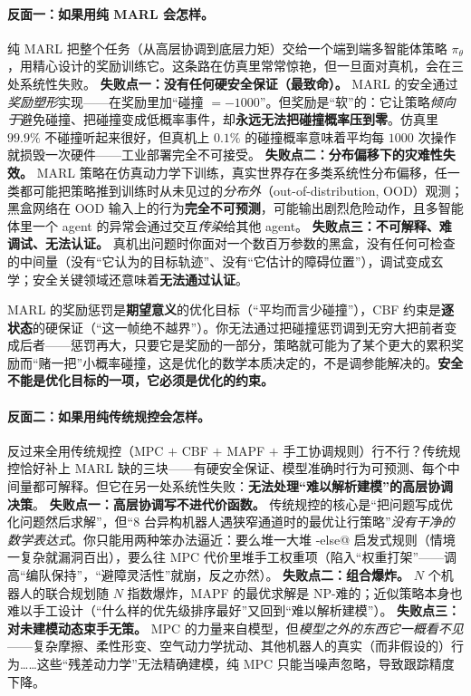 \paragraph{反面一：如果用纯 MARL 会怎样。}
纯 MARL 把整个任务（从高层协调到底层力矩）交给一个端到端多智能体策略 $\pi_\theta$，用精心设计的奖励训练它。这条路在仿真里常常惊艳，但一旦面对真机，会在三处系统性失败。
\textbf{失败点一：没有任何硬安全保证（最致命）。} MARL 的安全通过\emph{奖励塑形}实现——在奖励里加“碰撞 $=-1000$”。但奖励是“软”的：它让策略\emph{倾向于}避免碰撞、把碰撞变成低概率事件，却\textbf{永远无法把碰撞概率压到零}。仿真里 $99.9\%$ 不碰撞听起来很好，但真机上 $0.1\%$ 的碰撞概率意味着平均每 $1000$ 次操作就损毁一次硬件——工业部署完全不可接受。
\textbf{失败点二：分布偏移下的灾难性失效。} MARL 策略在仿真动力学下训练，真实世界存在多类系统性分布偏移，任一类都可能把策略推到训练时从未见过的\emph{分布外}（out-of-distribution, OOD）观测；黑盒网络在 OOD 输入上的行为\textbf{完全不可预测}，可能输出剧烈危险动作，且多智能体里一个 agent 的异常会通过交互\emph{传染}给其他 agent。
\textbf{失败点三：不可解释、难调试、无法认证。} 真机出问题时你面对一个数百万参数的黑盒，没有任何可检查的中间量（没有“它认为的目标轨迹”、没有“它估计的障碍位置”），调试变成玄学；安全关键领域还意味着\textbf{无法通过认证}。

\begin{insight}
MARL 的奖励惩罚是\textbf{期望意义}的优化目标（“平均而言少碰撞”），CBF 约束是\textbf{逐状态}的硬保证（“这一帧绝不越界”）。你无法通过把碰撞惩罚调到无穷大把前者变成后者——惩罚再大，只要它是奖励的一部分，策略就可能为了某个更大的累积奖励而“赌一把”小概率碰撞，这是优化的数学本质决定的，不是调参能解决的。\textbf{安全不能是优化目标的一项，它必须是优化的约束。}
\end{insight}

\paragraph{反面二：如果用纯传统规控会怎样。}
反过来全用传统规控（MPC $+$ CBF $+$ MAPF $+$ 手工协调规则）行不行？传统规控恰好补上 MARL 缺的三块——有硬安全保证、模型准确时行为可预测、每个中间量都可解释。但它在另一处系统性失败：\textbf{无法处理“难以解析建模”的高层协调决策}。
\textbf{失败点一：高层协调写不进代价函数。} 传统规控的核心是“把问题写成优化问题然后求解”，但“$8$ 台异构机器人遇狭窄通道时的最优让行策略”\emph{没有干净的数学表达式}。你只能用两种笨办法逼近：要么堆一大堆 \verb@if-else@ 启发式规则（情境一复杂就漏洞百出），要么往 MPC 代价里堆手工权重项（陷入“权重打架”——调高“编队保持”，“避障灵活性”就崩，反之亦然）。
\textbf{失败点二：组合爆炸。} $N$ 个机器人的联合规划随 $N$ 指数爆炸，MAPF 的最优求解是 NP-难的；近似策略本身也难以手工设计（“什么样的优先级排序最好”又回到“难以解析建模”）。
\textbf{失败点三：对未建模动态束手无策。} MPC 的力量来自模型，但\emph{模型之外的东西它一概看不见}——复杂摩擦、柔性形变、空气动力学扰动、其他机器人的真实（而非假设的）行为……这些“残差动力学”无法精确建模，纯 MPC 只能当噪声忽略，导致跟踪精度下降。


